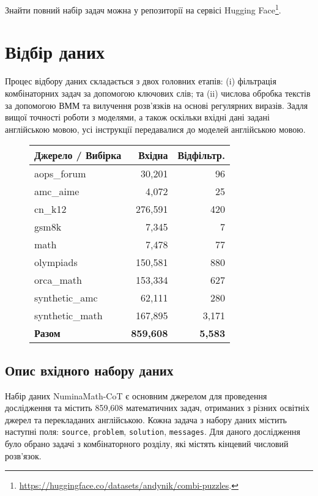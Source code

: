 Знайти повний набір задач можна у репозиторії на сервісі Hugging Face\footnote{\url{https://huggingface.co/datasets/andynik/combi-puzzles}.}.

\section{Відбір даних}
\label{sec:problem-selection}

Процес відбору даних складається з двох головних етапів: (i) фільтрація комбінаторних задач за допомогою ключових слів; та (ii) числова обробка текстів за допомогою ВММ та вилучення розв'язків на основі регулярних виразів. Задля вищої точності роботи з моделями, а також оскільки вхідні дані задані англійською мовою, усі інструкції передавалися до моделей англійською мовою.

\begin{figure}[ht]
    \centering
    \label{tab:merged_sources}
    \begin{tabular}{|l|r|r|}
        \hline
        Джерело / Вибірка & Вхідна & Відфільтр. \\
        \hline
        aops\_forum & 30,201 & 96 \\
        amc\_aime & 4,072 & 25 \\
        cn\_k12 & 276,591 & 420 \\
        gsm8k & 7,345 & 7 \\
        math & 7,478 & 77 \\
        olympiads & 150,581 & 880 \\
        orca\_math & 153,334 & 627 \\
        synthetic\_amc & 62,111 & 280 \\
        synthetic\_math & 167,895 & 3,171 \\
        \hline
        \textbf{Разом} & \textbf{859,608} & \textbf{5,583} \\
        \hline
    \end{tabular}
\end{figure}

\subsection{Опис вхідного набору даних}
Набір даних NuminaMath-CoT є основним джерелом для проведення дослідження та містить 859,608 математичних задач, отриманих з різних освітніх джерел та перекладаних англійською. Кожна задача з набору даних містить наступні поля: \texttt{source}, \texttt{problem}, \texttt{solution}, \texttt{messages}. Для даного дослідження було обрано задачі з комбінаторного розділу, які містять кінцевий числовий розв'язок.

